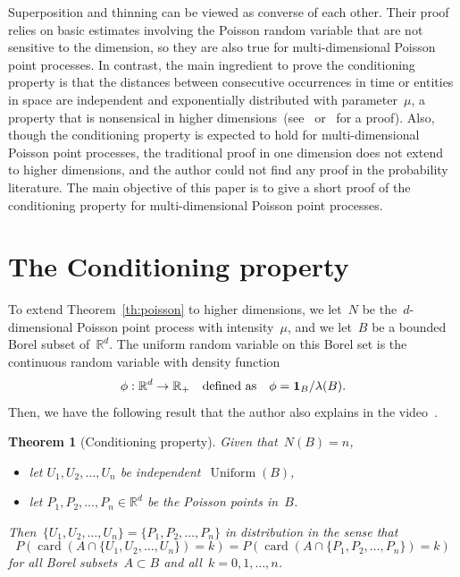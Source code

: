 \documentclass[10pt,a4paper]{amsart}
\newcommand{\R}{\mathbb{R}}
\newcommand{\ind}{\mathbf{1}}
\DeclareMathOperator{\uniform}{Uniform}
\DeclareMathOperator{\card}{card}
\newtheorem{theorem}{Theorem}
\begin{document}
 Superposition and thinning can be viewed as converse of each other.
 Their proof relies on basic estimates involving the Poisson random variable that are not sensitive to the dimension, so they are also true for multi-dimensional Poisson point processes.
 In contrast, the main ingredient to prove the conditioning property is that the distances between consecutive occurrences in time or entities in space are independent and exponentially distributed with parameter~$\mu$, a property that is nonsensical in higher dimensions~(see~\cite[Lemma~9.4]{lanchier_2017} or~\cite[Theorem~5.2]{ross_2010} for a proof).
 Also, though the conditioning property is expected to hold for multi-dimensional Poisson point processes, the traditional proof in one dimension does not extend to higher dimensions, and the author could not find any proof in the probability literature.
 The main objective of this paper is to give a short proof of the conditioning property for multi-dimensional Poisson point processes.
 

\section{The Conditioning property}
 To extend Theorem~\ref{th:poisson} to higher dimensions, we let~$N$ be the~$d$-dimensional Poisson point process with intensity~$\mu$, and we let~$B$ be a bounded Borel subset of~$\R^d$.
 The uniform random variable on this Borel set is the continuous random variable with density function
 $$ \phi : \R^d \to \R_+ \quad \hbox{defined as} \quad \phi = \ind_B / \lambda (B). $$
 Then, we have the following result that the author also explains in the video~\cite{lanchier_2024}.

\begin{theorem}[Conditioning property]
 Given that~$N (B) = n$,
\begin{itemize}
\item let $U_1, U_2, \ldots, U_n$ be independent~$\uniform (B)$, \vspace*{4pt}
\item let $P_1, P_2, \ldots, P_n \in \R^d$ be the Poisson points in~$B$.
\end{itemize}
 Then~$\{U_1, U_2, \ldots, U_n \} = \{P_1, P_2, \ldots, P_n \}$ in distribution in the sense that
 $$ P (\card (A \cap \{U_1, U_2, \ldots, U_n \}) = k) = P (\card (A \cap \{P_1, P_2, \ldots, P_n \}) = k) $$
 for all Borel subsets~$A \subset B$ and all~$k = 0, 1, \ldots, n$.
\end{theorem}
\end{document}
